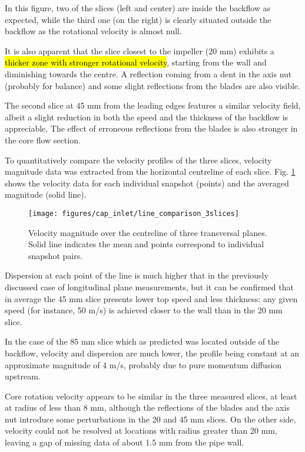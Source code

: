 In this figure, two of the slices (left and center) are inside the backflow as expected, while the third one (on the right) is clearly situated outside the backflow as the rotational velocity is almost null. 

It is also apparent that the slice closest to the impeller (20 mm) exhibits a \hl{thicker zone with stronger rotational velocity}, starting from the wall and diminishing towards the centre. A reflection coming from a dent in the axis nut (probably for balance) and some slight reflections from the blades are also visible.

The second slice at 45 mm from the leading edges features a similar velocity field, albeit a slight reduction in both the speed and the thickness of the backflow is appreciable. The effect of erroneous reflections from the blades is also stronger in the core flow section.

To quantitatively compare the velocity profiles of the three slices, velocity magnitude data was extracted from the horizontal centreline of each slice. Fig. \ref{fig:line_comp_3slices} shows the velocity data for each individual snapshot (points) and the averaged magnitude (solid line).

\begin{figure}[htb!]
\centering
\texttt{[image: figures/cap\_inlet/line\_comparison\_3slices]}
\caption{Velocity magnitude over the centreline of three transversal planes. Solid line indicates the mean and points correspond to individual snapshot pairs.}
\label{fig:line_comp_3slices}
\end{figure}

Dispersion at each point of the line is much higher that in the previously discussed case of longitudinal plane measurements, but it can be confirmed that in average the 45 mm slice presents lower top speed and less thickness: any given speed (for instance, 50 m/s) is achieved closer to the wall than in the 20 mm slice.

In the case of the 85 mm slice which as predicted was located outside of the backflow, velocity and dispersion are much lower, the profile being constant at an approximate magnitude of 4 m/s, probably due to pure momentum diffusion upstream.

Core rotation velocity appears to be similar in the three measured slices, at least at radius of less than 8 mm, although the reflections of the blades and the axis nut introduce some perturbations in the 20 and 45 mm slices. On the other side, velocity could not be resolved at locations with radius greater than 20 mm, leaving a gap of missing data of about 1.5 mm from the pipe wall.

